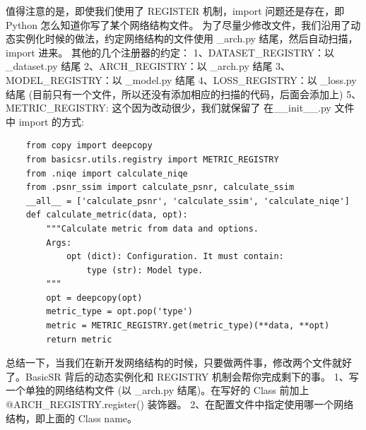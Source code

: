 \documentclass[../main.tex]{subfiles}
\begin{document}
    值得注意的是，即使我们使用了 REGISTER 机制，import 问题还是存在，即 Python 怎么知道你写了某个网络结构文件。
    为了尽量少修改文件，我们沿用了动态实例化时候的做法，约定网络结构的文件使用  \_arch.py 结尾，然后自动扫描，import 进来。
    其他的几个注册器的约定：
    1、DATASET\_REGISTRY：以 \_dataset.py 结尾
    2、ARCH\_REGISTRY：以 \_arch.py 结尾
    3、MODEL\_REGISTRY：以 \_model.py 结尾
    4、LOSS\_REGISTRY：以 \_loss.py 结尾 (目前只有一个文件，所以还没有添加相应的扫描的代码，后面会添加上)
    5、METRIC\_REGISTRY: 这个因为改动很少，我们就保留了 在\_\_init\_\_.py 文件中 import 的方式:
    \begin{verbatim}
    from copy import deepcopy
    from basicsr.utils.registry import METRIC_REGISTRY
    from .niqe import calculate_niqe
    from .psnr_ssim import calculate_psnr, calculate_ssim
    __all__ = ['calculate_psnr', 'calculate_ssim', 'calculate_niqe']
    def calculate_metric(data, opt):
        """Calculate metric from data and options.
        Args:
            opt (dict): Configuration. It must contain:
                type (str): Model type.
        """
        opt = deepcopy(opt)
        metric_type = opt.pop('type')
        metric = METRIC_REGISTRY.get(metric_type)(**data, **opt)
        return metric
    \end{verbatim}
    总结一下，当我们在新开发网络结构的时候，只要做两件事，修改两个文件就好了。BasicSR 背后的动态实例化和 REGISTRY 机制会帮你完成剩下的事。
    1、写一个单独的网络结构文件 (以 \_arch.py 结尾)。在写好的 Class 前加上 @ARCH\_REGISTRY.register() 装饰器。
    2、在配置文件中指定使用哪一个网络结构，即上面的 Class name。
\end{document}
